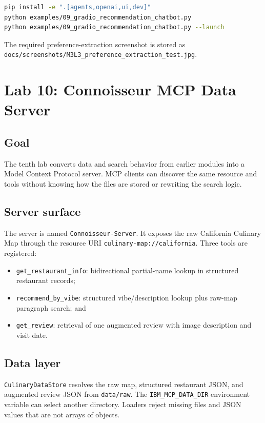 \documentclass[11pt]{article}
\begin{document}
\begin{lstlisting}[language=bash]
pip install -e ".[agents,openai,ui,dev]"
python examples/09_gradio_recommendation_chatbot.py
python examples/09_gradio_recommendation_chatbot.py --launch
\end{lstlisting}

The required preference-extraction screenshot is stored as
\texttt{docs/screenshots/M3L3\_preference\_extraction\_test.jpg}.

\section{Lab 10: Connoisseur MCP Data Server}

\subsection{Goal}

The tenth lab converts data and search behavior from earlier modules into a
Model Context Protocol server. MCP clients can discover the same resource and
tools without knowing how the files are stored or rewriting the search logic.

\subsection{Server surface}

The server is named \texttt{Connoisseur-Server}. It exposes the raw California
Culinary Map through the resource URI
\texttt{culinary-map://california}. Three tools are registered:

\begin{itemize}
  \item \texttt{get\_restaurant\_info}: bidirectional partial-name lookup in
        structured restaurant records;
  \item \texttt{recommend\_by\_vibe}: structured vibe/description lookup plus
        raw-map paragraph search; and
  \item \texttt{get\_review}: retrieval of one augmented review with image
        description and visit date.
\end{itemize}

\subsection{Data layer}

\texttt{CulinaryDataStore} resolves the raw map, structured restaurant JSON, and
augmented review JSON from \texttt{data/raw}. The
\texttt{IBM\_MCP\_DATA\_DIR} environment variable can select another directory.
Loaders reject missing files and JSON values that are not arrays of objects.
\end{document}
